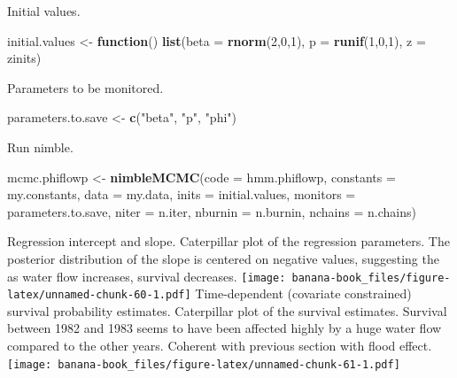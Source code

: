 \documentclass[
  12pt,
]{krantz}
\newenvironment{Shaded}{\begin{snugshade}}{\end{snugshade}}
\newcommand{\AttributeTok}[1]{\textcolor[rgb]{0.13,0.29,0.53}{#1}}
\newcommand{\ControlFlowTok}[1]{\textcolor[rgb]{0.13,0.29,0.53}{\textbf{#1}}}
\newcommand{\DecValTok}[1]{\textcolor[rgb]{0.00,0.00,0.81}{#1}}
\newcommand{\FunctionTok}[1]{\textcolor[rgb]{0.13,0.29,0.53}{\textbf{#1}}}
\newcommand{\NormalTok}[1]{#1}
\newcommand{\OtherTok}[1]{\textcolor[rgb]{0.56,0.35,0.01}{#1}}
\newcommand{\StringTok}[1]{\textcolor[rgb]{0.31,0.60,0.02}{#1}}
\begin{document}
Initial values.

\begin{Shaded}
\begin{Highlighting}[]
\NormalTok{initial.values }\OtherTok{\textless{}{-}} \ControlFlowTok{function}\NormalTok{() }\FunctionTok{list}\NormalTok{(}\AttributeTok{beta =} \FunctionTok{rnorm}\NormalTok{(}\DecValTok{2}\NormalTok{,}\DecValTok{0}\NormalTok{,}\DecValTok{1}\NormalTok{),}
                                  \AttributeTok{p =} \FunctionTok{runif}\NormalTok{(}\DecValTok{1}\NormalTok{,}\DecValTok{0}\NormalTok{,}\DecValTok{1}\NormalTok{),}
                                  \AttributeTok{z =}\NormalTok{ zinits)}
\end{Highlighting}
\end{Shaded}

Parameters to be monitored.

\begin{Shaded}
\begin{Highlighting}[]
\NormalTok{parameters.to.save }\OtherTok{\textless{}{-}} \FunctionTok{c}\NormalTok{(}\StringTok{"beta"}\NormalTok{, }\StringTok{"p"}\NormalTok{, }\StringTok{"phi"}\NormalTok{)}
\end{Highlighting}
\end{Shaded}

Run nimble.

\begin{Shaded}
\begin{Highlighting}[]
\NormalTok{mcmc.phiflowp }\OtherTok{\textless{}{-}} \FunctionTok{nimbleMCMC}\NormalTok{(}\AttributeTok{code =}\NormalTok{ hmm.phiflowp, }
                          \AttributeTok{constants =}\NormalTok{ my.constants,}
                          \AttributeTok{data =}\NormalTok{ my.data,              }
                          \AttributeTok{inits =}\NormalTok{ initial.values,}
                          \AttributeTok{monitors =}\NormalTok{ parameters.to.save,}
                          \AttributeTok{niter =}\NormalTok{ n.iter,}
                          \AttributeTok{nburnin =}\NormalTok{ n.burnin, }
                          \AttributeTok{nchains =}\NormalTok{ n.chains)}
\end{Highlighting}
\end{Shaded}

Regression intercept and slope. Caterpillar plot of the regression parameters. The posterior distribution of the slope is centered on negative values, suggesting the as water flow increases, survival decreases.
\texttt{[image: banana-book\_files/figure-latex/unnamed-chunk-60-1.pdf]}
Time-dependent (covariate constrained) survival probability estimates. Caterpillar plot of the survival estimates. Survival between 1982 and 1983 seems to have been affected highly by a huge water flow compared to the other years. Coherent with previous section with flood effect.
\texttt{[image: banana-book\_files/figure-latex/unnamed-chunk-61-1.pdf]}
\end{document}
